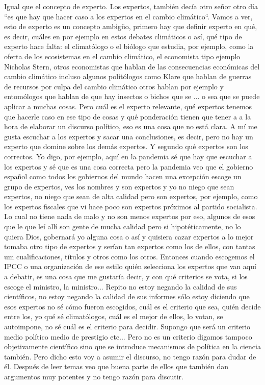 Igual que el concepto de experto. Los expertos, también decía otro señor otro día ``es que hay que hacer caso a los expertos en el cambio climático``. Vamos a ver, esto de experto es un concepto ambigüo, primero hay que definir experto en qué, es decir, cuáles en por ejemplo en estos debates climáticos o así, qué tipo de experto hace falta: el climatólogo o el biólogo que estudia, por ejemplo, como la oferta de los ecosistemas en el cambio climático, el economista tipo ejemplo Nicholas Stern, otros economistas que hablan de las consecuencias económicas del cambio climático incluso algunos politólogos como Klare que hablan de guerras de recursos por culpa del cambio climático otros hablan por ejemplo y entomólogos que hablan de que hay insectos o bichos que se ... o sea que se puede aplicar a muchas cosas. Pero cuál es el experto relevante, qué expertos tenemos que hacerle caso en ese tipo de cosas y qué ponderación tienen que tener a a la hora de elaborar un discurso político, eso es una cosa que no está clara. A mí me gusta escuchar a los expertos y sacar una conclusiones, es decir, pero no hay un experto que domine sobre los demás expertos. Y segundo qué expertos son los correctos. Yo digo, por ejemplo, aquí en la pandemia sé que hay que escuchar a los expertos y sé que es una cosa correcta pero la pandemia veo que el gobierno español como todos los gobiernos del mundo hacen una excepción escoge un grupo de expertos, ves los nombres y son expertos y yo no niego que sean expertos, no niego que sean de alta calidad pero son expertos, por ejemplo, como los expertos fiscales que vi hace poco son expertos próximos al partido socialista. Lo cual no tiene nada de malo y no son menos expertos por eso, algunos de esos que le que leí allí son gente de mucha calidad pero si hipotéticamente, no lo quiera Dios, gobernará yo alguna cosa o así y quisiera cazar expertos a lo mejor tomaba otro tipo de expertos y serían tan expertos como los de ellos, con tantas um cualificaciones, títulos y otros como los otros. Entonces cuando escogemos el IPCC o una organización de ese estilo quién selecciona los expertos que van aquí a debatir, es una cosa que me gustaría decir, y con qué criterios se vota, si los escoge el ministro, la ministro... Repito no estoy negando la calidad de sus científicos, no estoy negando la calidad de sus informes sólo estoy diciendo que esos expertos no sé cómo fueron escogidos, cuál es el criterio que sea, quién decide entre los, yo qué sé climatólogos, cuál es el mejor de ellos, lo votan, se autoimpone, no sé cuál es el criterio para decidir. Supongo que será un criterio medio político medio de prestigio etc... Pero no es un criterio digamos tampoco objetivamente científico sino que se introduce mecanismos de política en la ciencia también.  Pero dicho esto voy a asumir el discurso, no tengo razón para dudar de él. Después de leer temas veo que buena parte de ellos que también dan argumentos muy potentes y no tengo razón para discutir.


